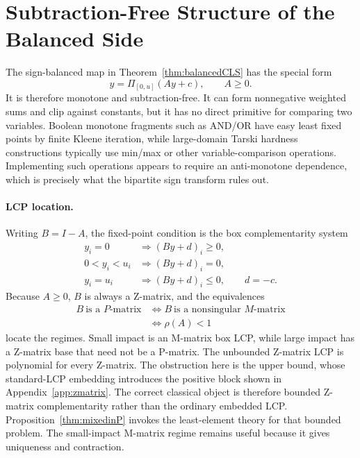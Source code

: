 \documentclass{llncs}
\newcommand{\clip}{\Pi}
\begin{document}
\section{Subtraction-Free Structure of the Balanced Side}
\label{app:subtractionfree}
The sign-balanced map in Theorem~\ref{thm:balancedCLS} has the special form
\[
        y=\clip_{[0,u]}(Ay+c),\qquad A\ge0 .
\]
It is therefore monotone and subtraction-free. It can form nonnegative weighted sums and clip against constants, but it has no direct primitive for comparing two variables. Boolean monotone fragments such as AND/OR have easy least fixed points by finite Kleene iteration, while large-domain Tarski hardness constructions typically use min/max or other variable-comparison operations. Implementing such operations appears to require an anti-monotone dependence, which is precisely what the bipartite sign transform rules out.

\paragraph{LCP location.}
Writing \(B=I-A\), the fixed-point condition is the box complementarity system
\[
\begin{aligned}
y_i=0&\Rightarrow (By+d)_i\ge0,\\
0<y_i<u_i&\Rightarrow (By+d)_i=0,\\
y_i=u_i&\Rightarrow (By+d)_i\le0,\qquad d=-c .
\end{aligned}
\]
Because \(A\ge0\), \(B\) is always a Z-matrix, and the equivalences
\[
\begin{aligned}
B\ \text{is a }P\text{-matrix}
&\Longleftrightarrow
B\ \text{is a nonsingular }M\text{-matrix}\\
&\Longleftrightarrow \rho(A)<1
\end{aligned}
\]
locate the regimes. Small impact is an M-matrix box LCP, while large impact has a Z-matrix base that need not be a P-matrix. The unbounded Z-matrix LCP is polynomial for every Z-matrix. The obstruction here is the upper bound, whose standard-LCP embedding introduces the positive block shown in Appendix~\ref{app:zmatrix}.
The correct classical object is therefore bounded Z-matrix complementarity rather than the ordinary embedded LCP. Proposition~\ref{thm:mixedinP} invokes the least-element theory for that bounded problem. The small-impact M-matrix regime remains useful because it gives uniqueness and contraction.
\end{document}
